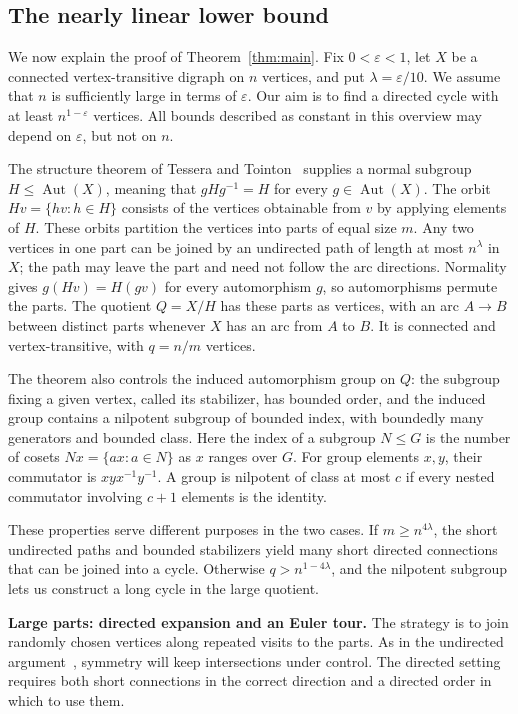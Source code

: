 \documentclass[11pt,a4paper,reqno]{amsart}
\theoremstyle{definition}
\theoremstyle{remark}
\numberwithin{equation}{section}
\DeclareMathOperator{\Aut}{Aut}
\newcommand{\eps}{\varepsilon}
\begin{document}
\subsection{The nearly linear lower bound}
We now explain the proof of Theorem~\ref{thm:main}. Fix $0<\eps<1$, let $X$ be a connected vertex-transitive digraph on $n$ vertices, and put $\lambda=\eps/10$. We assume that $n$ is sufficiently large in terms of $\eps$. Our aim is to find a directed cycle with at least $n^{1-\eps}$ vertices. All bounds described as constant in this overview may depend on $\eps$, but not on $n$.

The structure theorem of Tessera and Tointon~\cite{TT} supplies a normal subgroup $H\le\Aut(X)$, meaning that $gHg^{-1}=H$ for every $g\in\Aut(X)$. The orbit $Hv=\{hv:h\in H\}$ consists of the vertices obtainable from $v$ by applying elements of $H$. These orbits partition the vertices into parts of equal size $m$. Any two vertices in one part can be joined by an undirected path of length at most $n^\lambda$ in $X$; the path may leave the part and need not follow the arc directions. Normality gives $g(Hv)=H(gv)$ for every automorphism $g$, so automorphisms permute the parts. The quotient $Q=X/H$ has these parts as vertices, with an arc $A\to B$ between distinct parts whenever $X$ has an arc from $A$ to $B$. It is connected and vertex-transitive, with $q=n/m$ vertices.

The theorem also controls the induced automorphism group on $Q$: the subgroup fixing a given vertex, called its stabilizer, has bounded order, and the induced group contains a nilpotent subgroup of bounded index, with boundedly many generators and bounded class. Here the index of a subgroup $N\le G$ is the number of cosets $Nx=\{ax:a\in N\}$ as $x$ ranges over $G$. For group elements $x,y$, their commutator is $xyx^{-1}y^{-1}$. A group is nilpotent of class at most $c$ if every nested commutator involving $c+1$ elements is the identity.

These properties serve different purposes in the two cases. If $m\ge n^{4\lambda}$, the short undirected paths and bounded stabilizers yield many short directed connections that can be joined into a cycle. Otherwise $q>n^{1-4\lambda}$, and the nilpotent subgroup lets us construct a long cycle in the large quotient.

\medskip
\noindent\textbf{Large parts: directed expansion and an Euler tour.}
The strategy is to join randomly chosen vertices along repeated visits to the parts. As in the undirected argument~\cite[Section 4]{LiMethuku}, symmetry will keep intersections under control. The directed setting requires both short connections in the correct direction and a directed order in which to use them.
\end{document}
